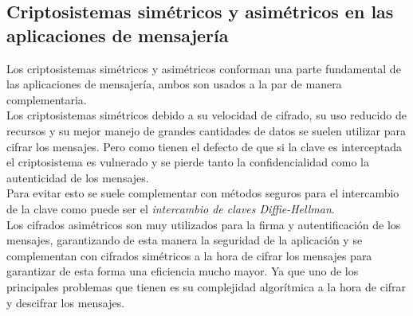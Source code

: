 \subsection{Criptosistemas simétricos y asimétricos en las aplicaciones de mensajería}
Los criptosistemas simétricos y asimétricos conforman una parte fundamental de las aplicaciones de mensajería, ambos son usados a la par de manera complementaria.\\
Los criptosistemas simétricos debido a su velocidad de cifrado, su uso reducido de recursos y su mejor manejo de grandes cantidades de datos se suelen utilizar para cifrar los mensajes. 
Pero como tienen el defecto de que si la clave es interceptada el criptosistema es vulnerado y se pierde tanto la confidencialidad como la autenticidad de los mensajes.\\ 
Para evitar esto se suele complementar con métodos seguros para el intercambio de la clave como puede ser el \emph{intercambio de claves Diffie-Hellman}.\\
Los cifrados asimétricos son muy utilizados para la firma y autentificación de los mensajes, garantizando de esta manera la seguridad de la aplicación y se complementan con cifrados simétricos a la hora de cifrar los mensajes para garantizar de esta forma una eficiencia mucho mayor. Ya que uno de los principales problemas que tienen es su complejidad algorítmica a la hora de cifrar y descifrar los mensajes.\\

